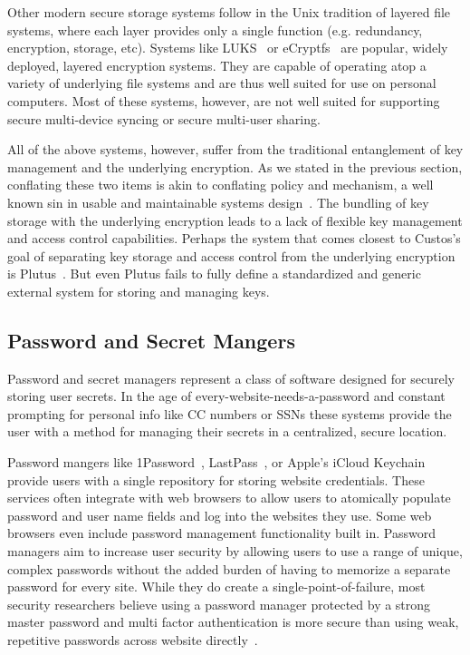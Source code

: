 Other modern secure storage systems follow in the Unix tradition of
layered file systems, where each layer provides only a single function
(e.g. redundancy, encryption, storage, etc). Systems like
LUKS~\cite{luks} or eCryptfs~\cite{eCryptfs, Halcrow} are popular,
widely deployed, layered encryption systems. They are capable of
operating atop a variety of underlying file systems and are thus well
suited for use on personal computers. Most of these systems, however,
are not well suited for supporting secure multi-device syncing or
secure multi-user sharing.

All of the above systems, however, suffer from the traditional
entanglement of key management and the underlying encryption. As we
stated in the previous section, conflating these two items is akin to
conflating policy and mechanism, a well known sin in usable and
maintainable systems design~\cite{Wulf1974}. The bundling of key
storage with the underlying encryption leads to a lack of flexible key
management and access control capabilities. Perhaps the system that
comes closest to Custos's goal of separating key storage and access
control from the underlying encryption is
Plutus~\cite{Kallahalla2003}. But even Plutus fails to fully define a
standardized and generic external system for storing and managing
keys.

\subsection{Password and Secret Mangers}

Password and secret managers represent a class of software designed
for securely storing user secrets. In the age of
every-website-needs-a-password and constant prompting for personal
info like CC numbers or SSNs these systems provide the user with a
method for managing their secrets in a centralized, secure location.

Password mangers like 1Password~\cite{onepassword},
LastPass~\cite{lastpass}, or Apple's iCloud Keychain~\cite{icloud}
provide users with a single repository for storing website
credentials. These services often integrate with web browsers to allow
users to atomically populate password and user name fields and log
into the websites they use. Some web browsers even include password
management functionality built in. Password managers aim to increase
user security by allowing users to use a range of unique, complex
passwords without the added burden of having to memorize a separate
password for every site. While they do create a
single-point-of-failure, most security researchers believe using a
password manager protected by a strong master password and multi
factor authentication is more secure than using weak, repetitive
passwords across website directly~\cite{schneier-passwords,
  krebs-passwords, brodkin-passman}.

